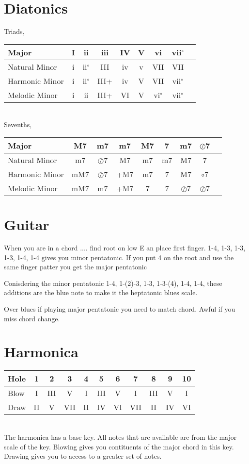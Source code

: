 \documentclass[a4paper]{scrartcl}
\begin{document}
\section{Diatonics}

Triads, \\
\begin{tabular}
{| l | c | c | c | c | c | c | c | c |}
\hline 
Major & I & ii & iii & IV & V & vi & vii$^\circ$  \\ \hline
Natural Minor & i & ii$^\circ$ & III & iv & v & VII & VII   \\ \hline 
Harmonic Minor & i & ii$^\circ$ & III+ & iv & V & VII & vii$^\circ$ \\ \hline
Melodic Minor & i & ii & III+ & VI & V & vi$^\circ$ & vii$^\circ$ \\ \hline
\end{tabular} \\
Sevenths, \\
\begin{tabular}
{| l | c | c | c | c | c | c | c | c |}
\hline 
Major & M7 & m7 & m7 & M7 & 7 & m7 & $\oslash$7  \\ \hline
Natural Minor & m7 & $\oslash$7 & M7 & m7 & m7 & M7 & 7    \\ \hline 
Harmonic Minor & mM7 & $\oslash$7 & +M7 & m7 & 7 & M7 & $\circ$7 \\ \hline
Melodic Minor & mM7 & m7 & +M7 & 7 & 7 & $\oslash$7 & $\oslash$7 \\ \hline
\end{tabular}


\section{Guitar}
When you are in a chord .... find root on low E an place first finger. 1-4, 1-3, 1-3, 1-3, 1-4, 1-4 gives you minor pentatonic. If you put 4 on the root and use the same finger patter you get the major pentatonic

Conisdering the minor pentatonic 1-4, 1-(2)-3, 1-3, 1-3-(4), 1-4, 1-4, these additions are the blue note to make it the heptatonic blues scale. 

Over blues if playing major pentatonic you need to match chord. Awful if you miss chord change.

\section{Harmonica}

\begin{tabular}
{| l | c | c | c | c | c | c | c | c | c | c |}
\hline 
Hole & 1 & 2 & 3 & 4 & 5 & 6 & 7 & 8 & 9 & 10 \\ \hline
Blow & I & III & V & I & III & V & I & III & V & I \\ \hline
Draw & II & V & VII & II & IV & VI & VII & II & IV & VI   \\ \hline 
\end{tabular} \\
The harmonica has a base key. All notes that are available are from the major scale of the key. Blowing gives you contituents of the major chord in this key. Drawing gives you to access to a greater set of notes.
\end{document}
